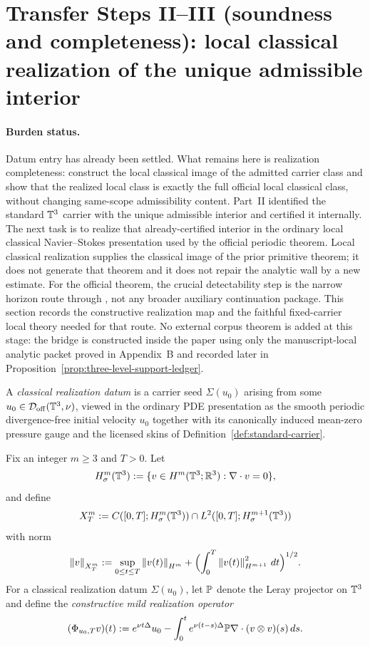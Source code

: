 \section{Transfer Steps II--III (soundness and completeness): local classical realization of the unique admissible interior}\label{sec:data-extraction-realization}
\paragraph{Burden status.}
Datum entry has already been settled. What remains here is realization completeness: construct the local classical image of the admitted carrier class and show that the realized local class is exactly the full official local classical class, without changing same-scope admissibility content.
Part~II identified the standard $\mathbb{T}^3$ carrier with the unique admissible interior and certified it internally. The next task is to realize that already-certified interior in the ordinary local classical Navier--Stokes presentation used by the official periodic theorem. Local classical realization supplies the classical image of the prior primitive theorem; it does not generate that theorem and it does not repair the analytic wall by a new estimate. For the official theorem, the crucial detectability step is the narrow horizon route through \HorizonDetectabilityRef{}, not any broader auxiliary continuation package. This section records the constructive realization map and the faithful fixed-carrier local theory needed for that route.
No external corpus theorem is added at this stage: the bridge is constructed inside the paper using only the manuscript-local analytic packet proved in Appendix~B and recorded later in Proposition~\ref{prop:three-level-support-ledger}.

\begin{definition}\label{def:classical-realization-datum}
A \emph{classical realization datum} is a carrier seed $\Sigma(u_0)$ arising from some
$u_0\in\mathcal D_{\mathrm{off}}(\mathbb{T}^3,\nu)$, viewed in the ordinary PDE presentation as the smooth
periodic divergence-free initial velocity $u_0$ together with its canonically induced mean-zero
pressure gauge and the licensed skins of Definition~\ref{def:standard-carrier}.
\end{definition}

\begin{definition}\label{def:mild-realization-operator}
Fix an integer $m\ge 3$ and $T>0$. Let
\[
H^m_\sigma(\mathbb{T}^3):=\{v\in H^m(\mathbb{T}^3;\mathbb{R}^3):\nabla\cdot v=0\},
\]
and define
\[
X_T^m:=C([0,T];H^m_\sigma(\mathbb{T}^3))\cap L^2([0,T];H^{m+1}_\sigma(\mathbb{T}^3))
\]
with norm
\[
\left\lVert v\right\rVert_{X_T^m}:=\sup_{0\le t\le T}\left\lVert v(t)\right\rVert_{H^m}
+\Bigl(\int_0^T \left\lVert v(t)\right\rVert_{H^{m+1}}^2\,dt\Bigr)^{1/2}.
\]
For a classical realization datum $\Sigma(u_0)$, let $\mathbb{P}$ denote the Leray projector on
$\mathbb{T}^3$ and define the \emph{constructive mild realization operator}
\[
(\Phi_{u_0,T}v)(t)
:= e^{\nu t\Delta}u_0
-\int_0^t e^{\nu (t-s)\Delta}\mathbb{P}\nabla\cdot(v\otimes v)(s)\,ds.
\]
\end{definition}

